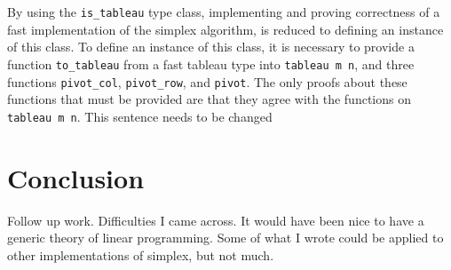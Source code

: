 \documentclass[11pt]{article} %
\begin{document}
By using the \lstinline|is_tableau| type class, implementing and proving correctness of a fast implementation of the simplex algorithm, is reduced to defining an instance of this class. To define an instance of this class, it is necessary to provide a function \lstinline|to_tableau| from a fast tableau type into \lstinline|tableau m n|, and three functions \lstinline|pivot_col|, \lstinline|pivot_row|, and \lstinline|pivot|. The only proofs about these functions that must be provided are that they agree with the functions on \lstinline|tableau m n|. \color{red} This sentence needs to be changed \color{black}



\section{Conclusion}
\color{red}
Follow up work. Difficulties I came across. It would have been nice to have a generic theory of linear programming. Some of what I wrote could be applied to other implementations of simplex, but not much.
\color{black}

\end{document}
